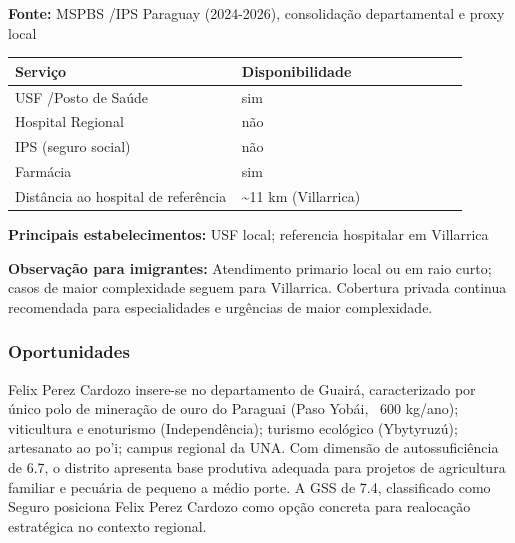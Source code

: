 \textbf{Fonte:} MSPBS /\allowbreak  IPS Paraguay (2024-2026), consolidação
departamental e proxy local

{\def\LTcaptype{none} %
\begin{longtable}{@{}>{\raggedright\arraybackslash}p{0.45\linewidth} >{\raggedright\arraybackslash}p{0.45\linewidth}@{}}
\toprule\noalign{}
Serviço & Disponibilidade \\
\midrule\noalign{}
\endhead
\bottomrule\noalign{}
\endlastfoot
USF /\allowbreak  Posto de Saúde & sim \\
Hospital Regional & não \\
IPS (seguro social) & não \\
Farmácia & sim \\
Distância ao hospital de referência & \textasciitilde11 km
(Villarrica) \\
\end{longtable}
}

\textbf{Principais estabelecimentos:} USF local; referencia hospitalar
em Villarrica

\textbf{Observação para imigrantes:} Atendimento primario local ou em
raio curto; casos de maior complexidade seguem para Villarrica.
Cobertura privada continua recomendada para especialidades e urgências
de maior complexidade.
\newpage

\subsubsection*{Oportunidades}\label{oport-felix-perez-cardozo-0405}
Felix Perez Cardozo insere-se no departamento de Guairá, caracterizado por único polo de mineração de ouro do Paraguai (Paso Yobái, ~600 kg/ano); viticultura e enoturismo (Independência); turismo ecológico (Ybytyruzú); artesanato ao po'i; campus regional da UNA. Com dimensão de autossuficiência de 6.7, o distrito apresenta base produtiva adequada para projetos de agricultura familiar e pecuária de pequeno a médio porte. A GSS de 7.4, classificado como Seguro posiciona Felix Perez Cardozo como opção concreta para realocação estratégica no contexto regional.

